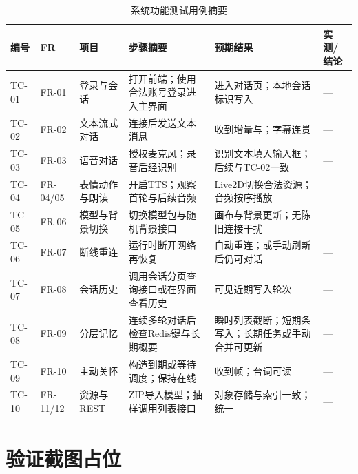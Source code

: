 \documentclass{base}
\begin{document}
\begin{table}[htbp]
    \centering
    \caption{系统功能测试用例摘要}
    \label{tab:test_cases}
    \begingroup
    \small
    \sloppy
    \setlength{\tabcolsep}{6pt}
    \renewcommand{\arraystretch}{1.38}
    \begin{tabularx}{\textwidth}{@{} >{\raggedright\arraybackslash}p{1.05cm} >{\raggedright\arraybackslash}p{1.25cm} >{\raggedright\arraybackslash}p{2.15cm} Y Y >{\raggedright\arraybackslash}p{2.45cm} @{}}
        \toprule
        \textbf{编号} & \textbf{FR} & \textbf{项目} & \textbf{步骤摘要} & \textbf{预期结果} & \textbf{实测/结论} \\
        \midrule
        TC-01 & FR-01 & 登录与会话 & 打开前端；使用合法账号登录进入主界面 & 进入对话页；本地会话标识写入 & — \\
        TC-02 & FR-02 & 文本流式对话 & 连接后发送文本消息 & 收到增量与；字幕连贯 & — \\
        TC-03 & FR-03 & 语音对话 & 授权麦克风；录音后经识别 & 识别文本填入输入框；后续与TC-02一致 & — \\
        TC-04 & FR-04/05 & 表情动作与朗读 & 开启TTS；观察首轮与后续音频 & Live2D切换合法资源；音频按序播放 & — \\
        TC-05 & FR-06 & 模型与背景切换 & 切换模型包与随机背景接口 & 画布与背景更新；无陈旧连接干扰 & — \\
        TC-06 & FR-07 & 断线重连 & 运行时断开网络再恢复 & 自动重连；或手动刷新后仍可对话 & — \\
        TC-07 & FR-08 & 会话历史 & 调用会话分页查询接口或在界面查看历史 & 可见近期写入轮次 & — \\
        TC-08 & FR-09 & 分层记忆 & 连续多轮对话后检查Redis键与长期概要 & 瞬时列表截断；短期条写入；长期任务或手动合并可更新 & — \\
        TC-09 & FR-10 & 主动关怀 & 构造到期或等待调度；保持在线 & 收到帧；台词可读 & — \\
        TC-10 & FR-11/12 & 资源与REST & ZIP导入模型；抽样调用列表接口 & 对象存储与索引一致；统一 & — \\
        \bottomrule
    \end{tabularx}
    \endgroup
\end{table}

\section{验证截图占位}
\end{document}
